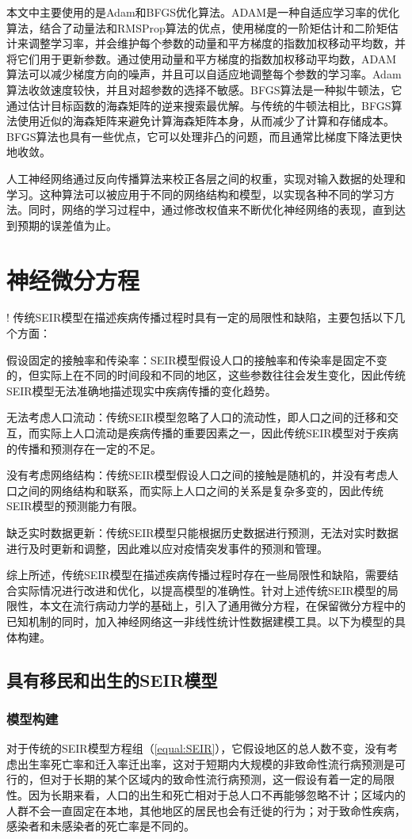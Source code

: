 本文中主要使用的是Adam和BFGS优化算法。ADAM是一种自适应学习率的优化算法，结合了动量法和RMSProp算法的优点，使用梯度的一阶矩估计和二阶矩估计来调整学习率，并会维护每个参数的动量和平方梯度的指数加权移动平均数，并将它们用于更新参数。通过使用动量和平方梯度的指数加权移动平均数，ADAM算法可以减少梯度方向的噪声，并且可以自适应地调整每个参数的学习率。Adam算法收敛速度较快，并且对超参数的选择不敏感。BFGS算法是一种拟牛顿法，它通过估计目标函数的海森矩阵的逆来搜索最优解。与传统的牛顿法相比，BFGS算法使用近似的海森矩阵来避免计算海森矩阵本身，从而减少了计算和存储成本。BFGS算法也具有一些优点，它可以处理非凸的问题，而且通常比梯度下降法更快地收敛。

人工神经网络通过反向传播算法来校正各层之间的权重，实现对输入数据的处理和学习。这种算法可以被应用于不同的网络结构和模型，以实现各种不同的学习方法。同时，网络的学习过程中，通过修改权值来不断优化神经网络的表现，直到达到预期的误差值为止。
\newpage
\section{神经微分方程}
!
传统SEIR模型在描述疾病传播过程时具有一定的局限性和缺陷，主要包括以下几个方面：

假设固定的接触率和传染率：SEIR模型假设人口的接触率和传染率是固定不变的，但实际上在不同的时间段和不同的地区，这些参数往往会发生变化，因此传统SEIR模型无法准确地描述现实中疾病传播的变化趋势。

无法考虑人口流动：传统SEIR模型忽略了人口的流动性，即人口之间的迁移和交互，而实际上人口流动是疾病传播的重要因素之一，因此传统SEIR模型对于疾病的传播和预测存在一定的不足。

没有考虑网络结构：传统SEIR模型假设人口之间的接触是随机的，并没有考虑人口之间的网络结构和联系，而实际上人口之间的关系是复杂多变的，因此传统SEIR模型的预测能力有限。

缺乏实时数据更新：传统SEIR模型只能根据历史数据进行预测，无法对实时数据进行及时更新和调整，因此难以应对疫情突发事件的预测和管理。

综上所述，传统SEIR模型在描述疾病传播过程时存在一些局限性和缺陷，需要结合实际情况进行改进和优化，以提高模型的准确性。针对上述传统SEIR模型的局限性，本文在流行病动力学的基础上，引入了通用微分方程，在保留微分方程中的已知机制的同时，加入神经网络这一非线性统计性数据建模工具。以下为模型的具体构建。

\subsection{具有移民和出生的SEIR模型}
\subsubsection{模型构建}
对于传统的SEIR模型方程组（\ref{equal:SEIR}），它假设地区的总人数不变，没有考虑出生率死亡率和迁入率迁出率，这对于短期内大规模的非致命性流行病预测是可行的，但对于长期的某个区域内的致命性流行病预测，这一假设有着一定的局限性。因为长期来看，人口的出生和死亡相对于总人口不再能够忽略不计；区域内的人群不会一直固定在本地，其他地区的居民也会有迁徙的行为；对于致命性疾病，感染者和未感染者的死亡率是不同的。

